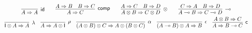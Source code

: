 \documentclass[submission,copyright,creativecommons]{eptcs}
\theoremstyle{definition}
\newcommand{\id}{\mathsf{id}}
\newcommand{\ot}{\otimes}
\newcommand{\lolli}{\multimap}
\newcommand{\I}{\mathsf{I}}
\begin{document}
\begin{displaymath}
  \def\arraystretch{1.5}
  \begin{array}{c}
        \infer[\id]{A \Rightarrow A}{}
        \qquad
        \infer[\mathsf{comp}]{A \Rightarrow C}{
          A \Rightarrow B
          &
          B \Rightarrow C
        }
        \qquad
      \infer[\otimes]{A \ot B \Rightarrow C \ot D}{
        A \Rightarrow C
        &
        B \Rightarrow D
      }
      \qquad
      \infer[\lolli]{A \lolli B \Rightarrow C \lolli D}{
        C \Rightarrow A
        &
        B \Rightarrow D
      }
      \\
      \infer[\lambda]{\I \ot A \Rightarrow A}{}
      \quad
      \infer[\rho]{A \Rightarrow A \ot \I}{}
      \quad
      \infer[\alpha]{(A \ot B) \ot C \Rightarrow A \ot (B \ot C)}{}
      \quad
      \infer[\epsilon]{(A \lolli B) \ot A \Rightarrow B}{}
      \quad
      \infer[\mathsf{c}]{A \Rightarrow B \lolli C}{A \ot B \Rightarrow C}
  \end{array}
\end{displaymath}
\end{document}

